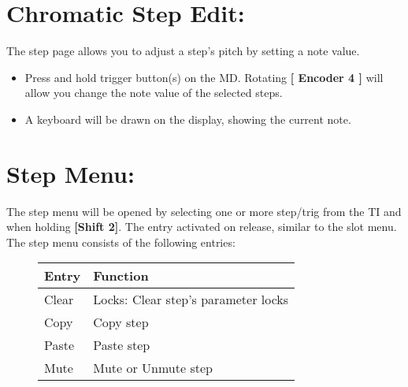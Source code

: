 \section{Chromatic Step Edit:}
The step page allows you to adjust a step's pitch by setting a note value. 
\begin{itemize}
\item Press and hold trigger button(s) on the MD. Rotating \textbf{[ Encoder 4 ]} will allow you change the note value of the selected steps.
\item A keyboard will be drawn on the display, showing the current note.
\end{itemize}

\section{Step Menu:}

The step menu will be opened by selecting one or more step/trig from the TI and when holding \textbf{[Shift 2]}. The entry activated on release, similar to the slot menu.
The step menu consists of the following entries:

\begin{figure}[hb]
    \begin{tabular}{|l|l|}
    \hline
    \rowcolor[HTML]{C0C0C0} 
    Entry            & Function \\ \hline
    Clear            & Locks: Clear step's parameter locks \\ \hline
    Copy         & Copy step\\ \hline
    Paste        & Paste step\\ \hline
    Mute         & Mute or Unmute step\\ \hline
    \end{tabular}
\end{figure}